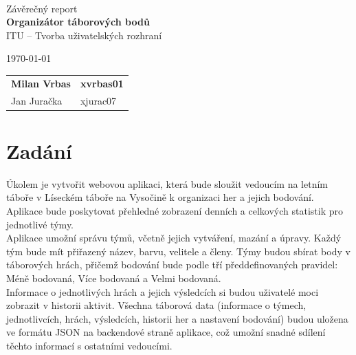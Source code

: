 \documentclass[a4paper, 12pt]{article} %
\begin{document}
\begin{titlepage}
    \begin{center}
         \\
        \Huge{Závěrečný report} \\
        \Large{\textbf{Organizátor táborových bodů}} \\
        \large{ITU – Tvorba uživatelských rozhraní }
    \end{center}

    {\large \today \hfill
        \large
        \begin{tabular}{l l}
        \textbf{Milan Vrbas} & \quad \textbf{xvrbas01}\\
        Jan Juračka           & \quad xjurac07      \\
        \end{tabular}
        }
\end{titlepage}

\tableofcontents
\thispagestyle{empty}
\newpage

\section{Zadání}
Úkolem je vytvořit webovou aplikaci, která bude sloužit vedoucím na letním táboře v 
Líseckém táboře na Vysočině k organizaci her a jejich bodování. Aplikace bude poskytovat 
přehledné zobrazení denních a celkových statistik pro jednotlivé týmy. \\
Aplikace umožní správu týmů, včetně jejich vytváření, mazání a úpravy. Každý tým bude mít 
přiřazený název, barvu, velitele a členy. Týmy budou sbírat body v táborových hrách, přičemž 
bodování bude podle tří předdefinovaných pravidel: Méně bodovaná, Více bodovaná a Velmi bodovaná. \\
Informace o jednotlivých hrách a jejich výsledcích si budou uživatelé moci zobrazit v 
historii aktivit. Všechna táborová data (informace o týmech, jednotlivcích, 
hrách, výsledcích, historii her a nastavení bodování) budou uložena ve formátu JSON na 
backendové straně aplikace, což umožní snadné sdílení těchto informací s ostatními vedoucími.
\end{document}
